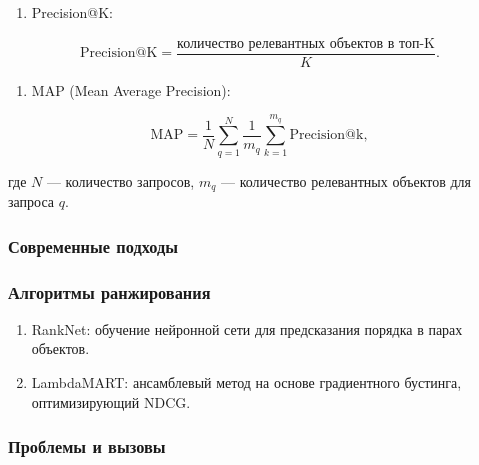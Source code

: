 \begin{enumerate}
\begin{enumerate}
\def\labelenumi{\arabic{enumi}.}
\setcounter{enumi}{3}
\tightlist
\item
  Precision@K:
\end{enumerate}

\begin{equation}
   \text{Precision@K} = \frac{\text{количество релевантных объектов в топ-K}}{K}.
\end{equation}

\begin{enumerate}
\def\labelenumi{\arabic{enumi}.}
\setcounter{enumi}{4}
\tightlist
\item
  MAP (Mean Average Precision):
\end{enumerate}

\begin{equation}
   \text{MAP} = \frac{1}{N} \sum_{q=1}^N \frac{1}{m_q} \sum_{k=1}^{m_q} \text{Precision@k},
\end{equation}

где \( N \) --- количество запросов, \( m_q \) --- количество релевантных
объектов для запроса \( q \).

\hypertarget{ux441ux43eux432ux440ux435ux43cux435ux43dux43dux44bux435-ux43fux43eux434ux445ux43eux434ux44b}{%
\subsubsection*{Современные
подходы}\label{ux441ux43eux432ux440ux435ux43cux435ux43dux43dux44bux435-ux43fux43eux434ux445ux43eux434ux44b}}

\subsubsection*{Алгоритмы ранжирования}
\begin{enumerate}
\def\labelenumi{\arabic{enumi}.}
\tightlist
\item
  RankNet: обучение нейронной сети для предсказания порядка в
  парах объектов.
\item
  LambdaMART: ансамблевый метод на основе градиентного
  бустинга, оптимизирующий NDCG.
\end{enumerate}

\hypertarget{ux43fux440ux43eux431ux43bux435ux43cux44b-ux438-ux432ux44bux437ux43eux432ux44b}{%
\subsubsection*{Проблемы и
вызовы}\label{ux43fux440ux43eux431ux43bux435ux43cux44b-ux438-ux432ux44bux437ux43eux432ux44b}}


\end{enumerate}
